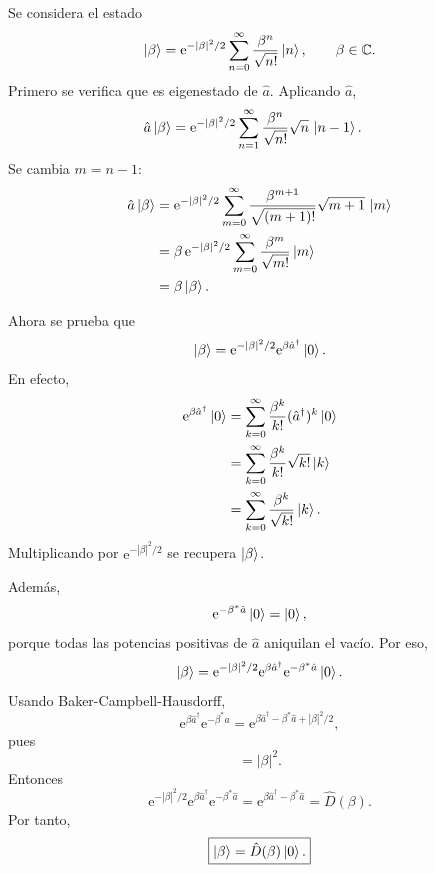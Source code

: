 \documentclass[11pt]{article}
\newcommand{\ee}{\mathrm{e}}
\newcommand{\adag}{\hat a^\dagger}
\begin{document}
Se considera el estado
\begin{equation}
  \ket{\beta}
  =
  \ee^{-|\beta|^2/2}
  \sum_{n=0}^{\infty}\frac{\beta^n}{\sqrt{n!}}\ket n,
  \qquad \beta\in\mathbb C.
\end{equation}
Primero se verifica que es eigenestado de $\hat a$. Aplicando $\hat a$,
\begin{align}
  \hat a\ket{\beta}
  &=
  \ee^{-|\beta|^2/2}
  \sum_{n=1}^{\infty}
  \frac{\beta^n}{\sqrt{n!}}\sqrt n\,\ket{n-1}.
\end{align}
Se cambia $m=n-1$:
\begin{align}
  \hat a\ket{\beta}
  &=
  \ee^{-|\beta|^2/2}
  \sum_{m=0}^{\infty}
  \frac{\beta^{m+1}}{\sqrt{(m+1)!}}\sqrt{m+1}\,\ket m\\
  &=
  \beta\,
  \ee^{-|\beta|^2/2}
  \sum_{m=0}^{\infty}
  \frac{\beta^m}{\sqrt{m!}}\ket m\\
  &=
  \beta\ket\beta.
\end{align}

Ahora se prueba que
\begin{equation}
  \ket{\beta}
  =
  \ee^{-|\beta|^2/2}\ee^{\beta\adag}\ket0.
\end{equation}
En efecto,
\begin{align}
  \ee^{\beta\adag}\ket0
  &=
  \sum_{k=0}^{\infty}
  \frac{\beta^k}{k!}(\adag)^k\ket0\\
  &=
  \sum_{k=0}^{\infty}
  \frac{\beta^k}{k!}\sqrt{k!}\ket k\\
  &=
  \sum_{k=0}^{\infty}
  \frac{\beta^k}{\sqrt{k!}}\ket k.
\end{align}
Multiplicando por $\ee^{-|\beta|^2/2}$ se recupera $\ket\beta$.

Adem\'as,
\begin{equation}
  \ee^{-\beta^*\hat a}\ket0=\ket0,
\end{equation}
porque todas las potencias positivas de $\hat a$ aniquilan el vac\'io. Por
eso,
\begin{equation}
  \ket\beta
  =
  \ee^{-|\beta|^2/2}
  \ee^{\beta\adag}
  \ee^{-\beta^*\hat a}\ket0.
\end{equation}
Usando Baker-Campbell-Hausdorff,
\begin{equation}
  \ee^{\beta\adag}\ee^{-\beta^*\hat a}
  =
  \ee^{\beta\adag-\beta^*\hat a+|\beta|^2/2},
\end{equation}
pues
\begin{equation}
  [\beta\adag,-\beta^*\hat a]=|\beta|^2.
\end{equation}
Entonces
\begin{equation}
  \ee^{-|\beta|^2/2}
  \ee^{\beta\adag}
  \ee^{-\beta^*\hat a}
  =
  \ee^{\beta\adag-\beta^*\hat a}
  =
  \hat D(\beta).
\end{equation}
Por tanto,
\begin{equation}
  \boxed{\ket\beta=\hat D(\beta)\ket0.}
\end{equation}
\end{document}
